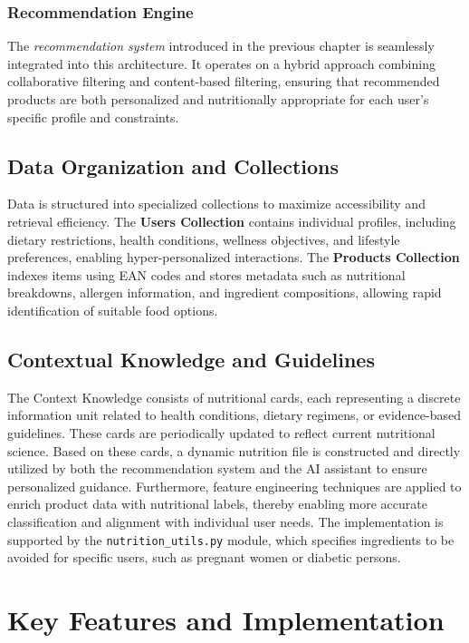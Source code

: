 \subsubsection{Recommendation Engine}
The \emph{recommendation system} introduced in the previous chapter is seamlessly integrated into this architecture. It operates on a hybrid approach combining collaborative filtering and content-based filtering, ensuring that recommended products are both personalized and nutritionally appropriate for each user's specific profile and constraints.

\subsection{Data Organization and Collections}
Data is structured into specialized collections to maximize accessibility and retrieval efficiency. The \textbf{Users Collection} contains individual profiles, including dietary restrictions, health conditions, wellness objectives, and lifestyle preferences, enabling hyper-personalized interactions. The \textbf{Products Collection} indexes items using EAN codes and stores metadata such as nutritional breakdowns, allergen information, and ingredient compositions, allowing rapid identification of suitable food options. 

\subsection{Contextual Knowledge and Guidelines}
The Context Knowledge consists of nutritional cards, each representing a discrete information unit related to health conditions, dietary regimens, or evidence-based guidelines. These cards are periodically updated to reflect current nutritional science. 
Based on these cards, a dynamic nutrition file is constructed and directly utilized by both the recommendation system and the AI assistant to ensure personalized guidance. Furthermore, feature engineering techniques are applied to enrich product data with nutritional labels, thereby enabling more accurate classification and alignment with individual user needs. The implementation is supported by the \texttt{nutrition\_utils.py} module, which specifies ingredients to be avoided for specific users, such as pregnant women or diabetic persons.


\section{Key Features and Implementation}

